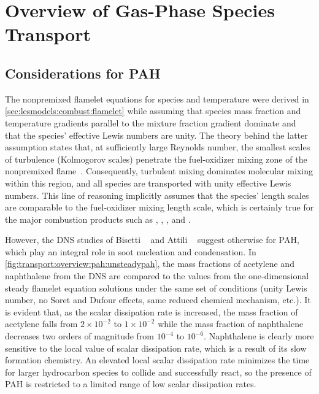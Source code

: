 \section{Overview of Gas-Phase Species Transport}
\label{sec:transport:overview}




\subsection{Considerations for PAH}
\label{sec:transport:overview:pah}

The nonpremixed flamelet equations for species and temperature were derived in \cref{sec:lesmodels:combust:flamelet} while assuming that species mass fraction and temperature gradients parallel to the mixture fraction gradient dominate and that the species' effective Lewis numbers are unity. The theory behind the latter assumption states that, at sufficiently large Reynolds number, the smallest scales of turbulence (Kolmogorov scales) penetrate the fuel-oxidizer mixing zone of the nonpremixed flame~\cite{peters1984}. Consequently, turbulent mixing dominates molecular mixing within this region, and all species are transported with unity effective Lewis numbers. This line of reasoning implicitly assumes that the species' length scales are comparable to the fuel-oxidizer mixing length scale, which is certainly true for the major combustion products such as , , , and .

However, the DNS studies of Bisetti \etal~\cite{bisetti2012} and Attili \etal~\cite{attili2014} suggest otherwise for PAH, which play an integral role in soot nucleation and condensation. In \cref{fig:transport:overview:pah:unsteadypah}, the mass fractions of acetylene and naphthalene from the DNS are compared to the values from the one-dimensional steady flamelet equation solutions under the same set of conditions (unity Lewis number, no Soret and Dufour effects, same reduced chemical mechanism, etc.). It is evident that, as the scalar dissipation rate is increased, the mass fraction of acetylene falls from $2 \times 10^{-2}$ to $1 \times 10^{-2}$ while the mass fraction of naphthalene decreases two orders of magnitude from $10^{-4}$ to $10^{-6}$. Naphthalene is clearly more sensitive to the local value of scalar dissipation rate, which is a result of its slow formation chemistry. An elevated local scalar dissipation rate minimizes the time for larger hydrocarbon species to collide and successfully react, so the presence of PAH is restricted to a limited range of low scalar dissipation rates.

